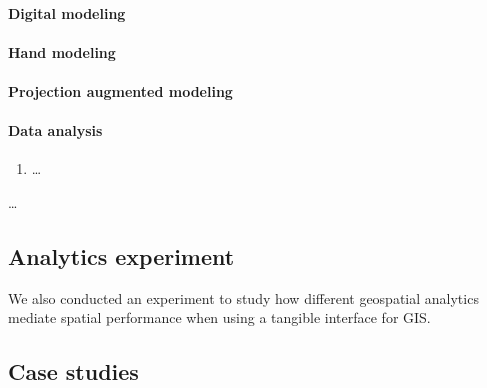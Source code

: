 \documentclass[prodmode,acmtochi]{acmsmall} %
\begin{document}
\paragraph{Digital modeling}





\paragraph{Hand modeling}


\paragraph{Projection augmented modeling}


\paragraph{Data analysis}



\begin{enumerate}[label=\arabic*),font=\itshape]
\item \ldots
\end{enumerate}


\begin{enumerate*}[label=\arabic*),font=\itshape]
\item \ldots
\end{enumerate*}





\subsection{Analytics experiment}
We also conducted an experiment to study how different geospatial analytics mediate spatial performance when using a tangible interface for GIS.





\subsection{Case studies}
\end{document}
